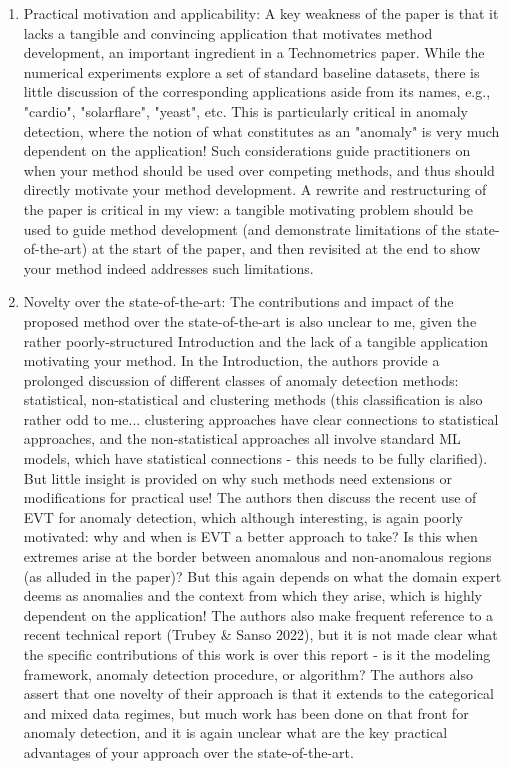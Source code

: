 \documentclass{article}
\begin{document}
\begin{enumerate}
\item Practical motivation and applicability: A key weakness of the paper is that it lacks a 
    tangible and convincing application that motivates method development, an important 
    ingredient in a Technometrics paper. While the numerical experiments explore a set of 
    standard baseline datasets, there is little discussion of the corresponding applications 
    aside from its names, e.g., "cardio", "solarflare", "yeast", etc. This is particularly 
    critical in anomaly detection, where the notion of what constitutes as an "anomaly" is 
    very much dependent on the application! Such considerations guide practitioners on when 
    your method should be used over competing methods, and thus should directly motivate your 
    method development. A rewrite and restructuring of the paper is critical in my view: a 
    tangible motivating problem should be used to guide method development (and demonstrate 
    limitations of the state-of-the-art) at the start of the paper, and then revisited at the 
    end to show your method indeed addresses such limitations. 

\item Novelty over the state-of-the-art: The contributions and impact of the proposed method 
    over the state-of-the-art is also unclear to me, given the rather poorly-structured 
    Introduction and the lack of a tangible application motivating your method. In the 
    Introduction, the authors provide a prolonged discussion of different classes of anomaly 
    detection methods: statistical, non-statistical and clustering methods (this classification 
    is also rather odd to me... clustering approaches have clear connections to statistical 
    approaches, and the non-statistical approaches all involve standard ML models, which have 
    statistical connections - this needs to be fully clarified). But little insight is provided 
    on why such methods need extensions or modifications for practical use! The authors then 
    discuss the recent use of EVT for anomaly detection, which although interesting, is again 
    poorly motivated: why and when is EVT a better approach to take? Is this when extremes 
    arise at the border between anomalous and non-anomalous regions (as alluded in the paper)? 
    But this again depends on what the domain expert deems as anomalies and the context from 
    which they arise, which is highly dependent on the application! The authors also make 
    frequent reference to a recent technical report (Trubey \& Sanso 2022), but it is not made 
    clear what the specific contributions of this work is over this report - is it the modeling 
    framework, anomaly detection procedure, or algorithm? The authors also assert that one 
    novelty of their approach is that it extends to the categorical and mixed data regimes, but 
    much work has been done on that front for anomaly detection, and it is again unclear what
    are the key practical advantages of your approach over the state-of-the-art.

\end{enumerate}
\end{document}
